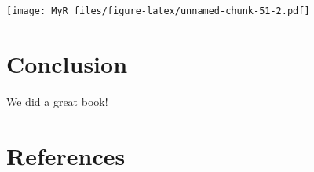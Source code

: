 \documentclass[]{book}
\theoremstyle{definition}
\theoremstyle{definition}
\theoremstyle{definition}
\theoremstyle{remark}
\begin{document}
\texttt{[image: MyR\_files/figure-latex/unnamed-chunk-51-2.pdf]}

\hypertarget{conclusion}{%
\chapter{Conclusion}\label{conclusion}}

We did a great book!

\hypertarget{references}{%
\chapter*{References}\label{references}}


\end{document}
